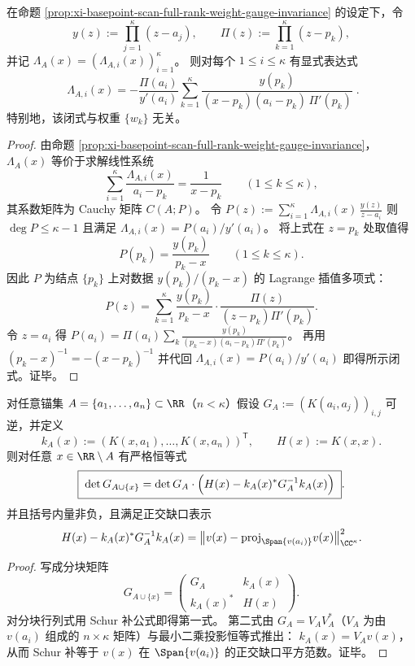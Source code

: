 \begin{proposition}\label{prop:xi-basepoint-scan-lambda-cauchy-lagrange-closed-form}
在命题 \ref{prop:xi-basepoint-scan-full-rank-weight-gauge-invariance} 的设定下，令
\[
y(z):=\prod_{j=1}^{\kappa}(z-a_j),\qquad \Pi(z):=\prod_{k=1}^{\kappa}(z-p_k),
\]
并记 \(\Lambda_A(x)=(\Lambda_{A,i}(x))_{i=1}^{\kappa}\)。
则对每个 \(1\le i\le \kappa\) 有显式表达式
\[
\boxed{\;
\Lambda_{A,i}(x)
=
-\frac{\Pi(a_i)}{y'(a_i)}
\sum_{k=1}^{\kappa}
\frac{y(p_k)}{(x-p_k)(a_i-p_k)\,\Pi'(p_k)}\; }.
\]
特别地，该闭式与权重 \(\{w_k\}\) 无关。
\end{proposition}
\begin{proof}
由命题 \ref{prop:xi-basepoint-scan-full-rank-weight-gauge-invariance}，\(\Lambda_A(x)\) 等价于求解线性系统
\[
\sum_{i=1}^{\kappa}\frac{\Lambda_{A,i}(x)}{a_i-p_k}=\frac{1}{x-p_k}\qquad(1\le k\le \kappa),
\]
其系数矩阵为 Cauchy 矩阵 \(C(A;P)\)。
令
\(
P(z):=\sum_{i=1}^{\kappa}\Lambda_{A,i}(x)\,\frac{y(z)}{z-a_i}
\)
则 \(\deg P\le \kappa-1\) 且满足 \(\Lambda_{A,i}(x)=P(a_i)/y'(a_i)\)。
将上式在 \(z=p_k\) 处取值得
\[
P(p_k)=\frac{y(p_k)}{p_k-x}\qquad(1\le k\le \kappa).
\]
因此 \(P\) 为结点 \(\{p_k\}\) 上对数据 \(y(p_k)/(p_k-x)\) 的 Lagrange 插值多项式：
\[
P(z)=\sum_{k=1}^{\kappa}\frac{y(p_k)}{p_k-x}\cdot \frac{\Pi(z)}{(z-p_k)\Pi'(p_k)}.
\]
令 \(z=a_i\) 得
\(
P(a_i)=\Pi(a_i)\sum_{k}\frac{y(p_k)}{(p_k-x)(a_i-p_k)\Pi'(p_k)}
\)。
再用 \((p_k-x)^{-1}=-(x-p_k)^{-1}\) 并代回 \(\Lambda_{A,i}(x)=P(a_i)/y'(a_i)\) 即得所示闭式。证毕。
\end{proof}

\begin{proposition}\label{prop:xi-basepoint-scan-gram-determinant-schur-increment}
对任意锚集 \(A=\{a_1,\dots,a_n\}\subset\RR\)（\(n<\kappa\)）假设 \(G_A:=(K(a_i,a_j))_{i,j}\) 可逆，并定义
\[
k_A(x):=(K(x,a_1),\dots,K(x,a_n))^{\mathsf T},\qquad
H(x):=K(x,x).
\]
则对任意 \(x\in\RR\setminus A\) 有严格恒等式
\[
\boxed{\;
\det G_{A\cup\{x\}}=\det G_A\cdot\Bigl(H(x)-k_A(x)^\ast G_A^{-1}k_A(x)\Bigr)\; } .
\]
并且括号内量非负，且满足正交缺口表示
\[
H(x)-k_A(x)^\ast G_A^{-1}k_A(x)
=\bigl\|v(x)-\mathrm{proj}_{\Span\{v(a_i)\}}v(x)\bigr\|_{\CC^\kappa}^{2}.
\]
\end{proposition}
\begin{proof}
写成分块矩阵
\[
G_{A\cup\{x\}}=
\begin{pmatrix}
G_A & k_A(x)\\
k_A(x)^\ast & H(x)
\end{pmatrix}.
\]
对分块行列式用 Schur 补公式即得第一式。
第二式由 \(G_A=V_AV_A^\ast\)（\(V_A\) 为由 \(v(a_i)\) 组成的 \(n\times\kappa\) 矩阵）与最小二乘投影恒等式推出：
\(
k_A(x)=V_A v(x)
\)，从而 Schur 补等于 \(v(x)\) 在 \(\Span\{v(a_i)\}\) 的正交缺口平方范数。证毕。
\end{proof}

